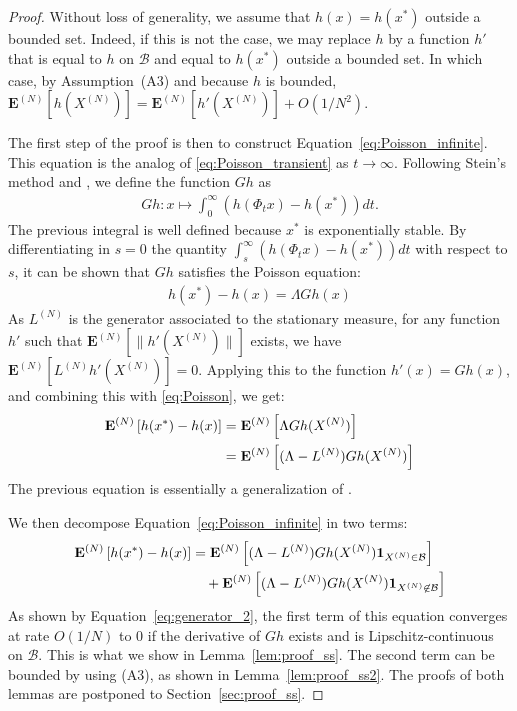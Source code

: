 \documentclass[acmlarge]{acmart}
\newcommand\XN{X^{(N)}}
\newcommand\LN{L^{(N)}}
\newcommand\calB{\mathcal{B}}
\newcommand\espN[1]{{\mathchoice{\bespN{#1}}{\sespN{#1}}{\sespN{#1}}{\sespN{#1}}}}
\newcommand\bespN[1]{\mathbf{E}^{(N)}\left[#1\right]}
\newcommand\sespN[1]{\mathbf{E}^{(N)}[#1]}
\newcommand\snorm[1]{\|#1\|}
\newcommand\p[1]{\left(#1\right)}
\begin{document}
\begin{proof}
  Without loss of generality, we assume that $h(x)=h(x^*)$ outside a
  bounded set. Indeed, if this is not the case, we may replace $h$ by
  a function $h'$ that is equal to $h$ on $\calB$ and equal to
  $h(x^*)$ outside a bounded set. In which case, by Assumption~(A3)
  and because $h$ is bounded,
  $\sespN{h(\XN)} = \sespN{h'(\XN)}+O(1/N^2)$.
  
  The first step of the proof is then to construct
  Equation~\eqref{eq:Poisson_infinite}. This equation is the analog of
  \eqref{eq:Poisson_transient} as $t\to\infty$. Following Stein's
  method and \cite{ying2016rate}, we define the function $Gh$ as
  \begin{align*}
    Gh : x\mapsto \int_0^\infty \p{h(\Phi_t x)-h(x^*)}dt. 
  \end{align*}
  The previous integral is well defined because $x^*$ is exponentially
  stable. By differentiating in $s=0$ the quantity
  $\int_s^\infty \p{h(\Phi_t x)-h(x^*)}dt$ with respect to $s$, it can
  be shown that $Gh$ satisfies the Poisson equation:
  \begin{align}
    h(x^*)-h(x) = \Lambda Gh(x)
    \label{eq:Poisson}
  \end{align}
  As $\LN$
  is the generator associated to the stationary measure, for any
  function $h'$
  such that $\sespN{\snorm{h'(\XN)}}$
  exists, we have $\sespN{\LN
    h'(\XN) }=0$.  Applying this to the function $h'(x)=G
  h(x)$, and combining this with \eqref{eq:Poisson}, we get:
\begin{align}
  \espN{h(x^*)-h(x)} &= \espN{\Lambda Gh(\XN)}\nonumber\\
                     &=\espN{(\Lambda-\LN)Gh(\XN)}
      \label{eq:Poisson_infinite}
\end{align}
The previous equation is essentially a generalization of
\cite[Equation~(4) and Equation~(7)]{ying2016rate}.

We then decompose Equation~\eqref{eq:Poisson_infinite} in two terms:
\begin{align*}
  \espN{h(x^*)-h(x)}
  &=\espN{(\Lambda-\LN)Gh(\XN)\mathbf{1}_{\XN\in\calB}}\\
  &\quad +\espN{(\Lambda-\LN)Gh(\XN)\mathbf{1}_{\XN\not\in\calB}}
\end{align*}
As shown by Equation~\eqref{eq:generator_2}, the first term of this
equation converges at rate $O(1/N)$
to $0$
if the derivative of $Gh$
exists and is Lipschitz-continuous on $\calB$.
This is what we show in Lemma~\ref{lem:proof_ss}. The second term can
be bounded by using (A3), as shown in Lemma~\ref{lem:proof_ss2}.  The
proofs of both lemmas are postponed to Section~\ref{sec:proof_ss}.
\end{proof}
\end{document}
